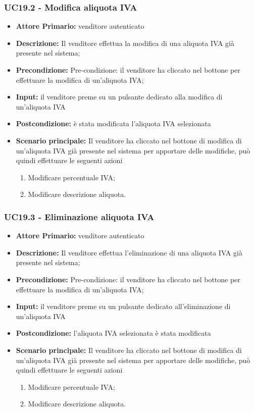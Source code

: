 \subsubsection{UC19.2 - Modifica aliquota IVA}
\label{UC19.2}
\begin{itemize}
    \item \textbf{Attore Primario:}  venditore autenticato
    \item \textbf{Descrizione:} Il venditore effettua la modifica di una aliquota IVA già presente nel sistema;
    \item \textbf{Precondizione:} Pre-condizione: il venditore ha cliccato nel bottone per effettuare la modifica di un’aliquota IVA;
    \item \textbf{Input:} il venditore preme su un pulsante dedicato alla modifica di un'aliquota IVA
    \item \textbf{Postcondizione:} è stata modificata l'aliquota IVA selezionata
    \item \textbf{Scenario principale:} Il venditore ha cliccato nel bottone di modifica di un’aliquota IVA già presente nel sistema per apportare delle modifiche, può quindi effettuare le seguenti azioni
    \begin{enumerate}
        \item Modificare percentuale IVA;
        \item Modificare descrizione aliquota.
    \end{enumerate}
\end{itemize}


\subsubsection{UC19.3 - Eliminazione aliquota IVA}
\label{UC19.3}
\begin{itemize}
    \item \textbf{Attore Primario:}  venditore autenticato
    \item \textbf{Descrizione:} Il venditore effettua l'eliminazione di una aliquota IVA già presente nel sistema;
    \item \textbf{Precondizione:} Pre-condizione: il venditore ha cliccato nel bottone per effettuare la modifica di un’aliquota IVA;
    \item \textbf{Input:} il venditore preme su un pulsante dedicato all'eliminazione di un'aliquota IVA
    \item \textbf{Postcondizione:} l'aliquota IVA selezionata è stata modificata
    \item \textbf{Scenario principale:} Il venditore ha cliccato nel bottone di modifica di un’aliquota IVA già presente nel sistema per apportare delle modifiche, può quindi effettuare le seguenti azioni
    \begin{enumerate}
        \item Modificare percentuale IVA;
        \item Modificare descrizione aliquota.
    \end{enumerate}
\end{itemize}



